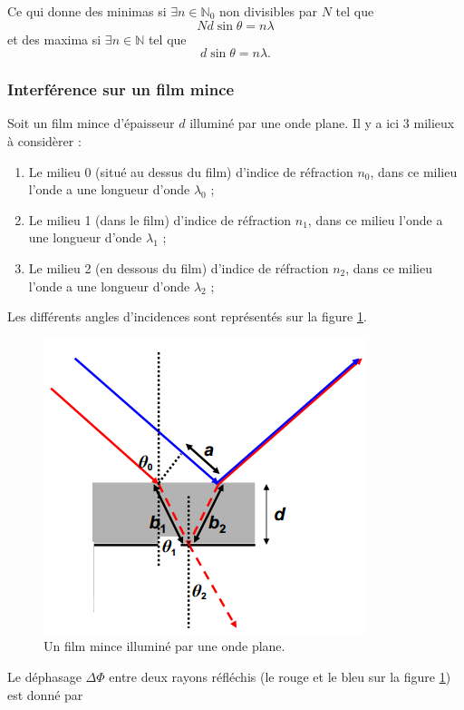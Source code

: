 Ce qui donne des minimas si
$\exists n \in \mathbb{N}_0$ non divisibles par $N$ tel que
\[ N d \sin \theta = n \lambda \]
et des maxima si $\exists n \in \mathbb{N}$ tel que
\[ d \sin \theta = n \lambda. \]

\subsubsection{Interférence sur un film mince}
Soit un film mince d'épaisseur $d$ illuminé par une onde
plane. Il y a ici 3 milieux à considèrer :

\begin{enumerate}
	\item Le milieu 0 (situé au dessus du film) d'indice
	de réfraction $n_0$, dans ce milieu l'onde a une longueur
	d'onde $\lambda_0$ ;
	\item Le milieu 1 (dans le film) d'indice de réfraction
	$n_1$, dans ce milieu l'onde a une longueur d'onde $\lambda_1$ ;
	\item Le milieu 2 (en dessous du film) d'indice de réfraction
	$n_2$, dans ce milieu l'onde a une longueur d'onde $\lambda_2$ ;
\end{enumerate}

Les différents angles d'incidences sont représentés sur la
figure \ref{fig:film-mince}.

\begin{figure}[ht!]
	\centering
		\includegraphics[scale=1.0]{film-mince.png}
		\caption{Un film mince illuminé par une onde plane.}
		\label{fig:film-mince}
\end{figure}

Le déphasage $\Delta \Phi$ entre deux rayons
réfléchis (le rouge et le bleu sur la figure \ref{fig:film-mince})
est donné par

